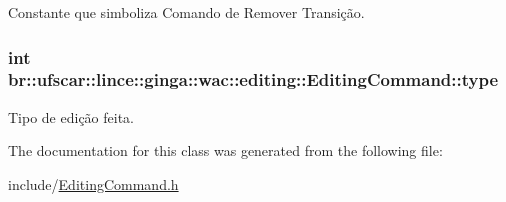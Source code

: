 Constante que simboliza Comando de Remover Transição. 

\hypertarget{classbr_1_1ufscar_1_1lince_1_1ginga_1_1wac_1_1editing_1_1EditingCommand_a186e9110f8aae8e562761939a85ee83e}{
\subsubsection[{type}]{\setlength{\rightskip}{0pt plus 5cm}int {\bf br::ufscar::lince::ginga::wac::editing::EditingCommand::type}}}
\label{classbr_1_1ufscar_1_1lince_1_1ginga_1_1wac_1_1editing_1_1EditingCommand_a186e9110f8aae8e562761939a85ee83e}


Tipo de edição feita. 



The documentation for this class was generated from the following file:\begin{DoxyCompactItemize}
\item 
include/\hyperlink{EditingCommand_8h}{EditingCommand.h}\end{DoxyCompactItemize}
